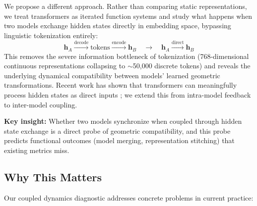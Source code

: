 \documentclass[10pt]{article} %
\theoremstyle{plain}
\theoremstyle{definition}
\theoremstyle{remark}
\newcommand{\vect}[1]{\bm{#1}}
\begin{document}
We propose a different approach. Rather than comparing static representations, we treat transformers as iterated function systems \citep{haber2017stable,chen2018neuralode} and study what happens when two models exchange hidden states directly in embedding space, bypassing linguistic tokenization entirely:
\begin{equation}
    \vect{h}_A \xrightarrow{\text{decode}} \text{tokens} \xrightarrow{\text{encode}} \vect{h}_B \quad \longrightarrow \quad \vect{h}_A \xrightarrow{\text{direct}} \vect{h}_B
\end{equation}
This removes the severe information bottleneck of tokenization (768-dimensional continuous representations collapsing to $\sim$50,000 discrete tokens) and reveals the underlying dynamical compatibility between models' learned geometric transformations. Recent work has shown that transformers can meaningfully process hidden states as direct inputs \citep{hao2024coconut,dehghani2019universal}; we extend this from intra-model feedback to inter-model coupling.

\textbf{Key insight:} Whether two models synchronize when coupled through hidden state exchange is a direct probe of geometric compatibility, and this probe predicts functional outcomes (model merging, representation stitching) that existing metrics miss.

\subsection{Why This Matters}

Our coupled dynamics diagnostic addresses concrete problems in current practice:
\end{document}
